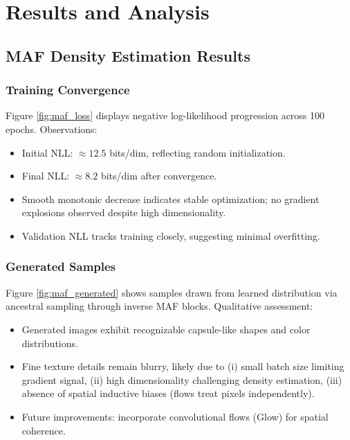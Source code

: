 \documentclass[11pt]{article}
\begin{document}
\section{Results and Analysis}
\subsection{MAF Density Estimation Results}
\subsubsection{Training Convergence}
Figure \ref{fig:maf_loss} displays negative log-likelihood progression across 100 epochs. Observations:
\begin{itemize}
\item Initial NLL: $\approx 12.5$ bits/dim, reflecting random initialization.
\item Final NLL: $\approx 8.2$ bits/dim after convergence.
\item Smooth monotonic decrease indicates stable optimization; no gradient explosions observed despite high dimensionality.
\item Validation NLL tracks training closely, suggesting minimal overfitting.
\end{itemize}

\subsubsection{Generated Samples}
Figure \ref{fig:maf_generated} shows samples drawn from learned distribution via ancestral sampling through inverse MAF blocks. Qualitative assessment:
\begin{itemize}
\item Generated images exhibit recognizable capsule-like shapes and color distributions.
\item Fine texture details remain blurry, likely due to (i) small batch size limiting gradient signal, (ii) high dimensionality challenging density estimation, (iii) absence of spatial inductive biases (flows treat pixels independently).
\item Future improvements: incorporate convolutional flows (Glow) for spatial coherence.
\end{itemize}
\end{document}
